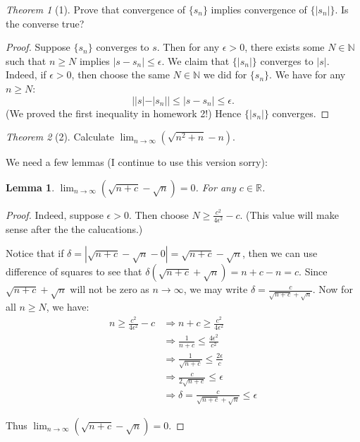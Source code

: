 \documentclass[12pt]{article}
\newtheorem*{lemma}{Lemma}
\theoremstyle{remark}
\theoremstyle{named}
\newtheorem*{theorem}{Theorem}
\renewcommand{\implies}{\Rightarrow}
\begin{document}
\begin{theorem}[1]
    Prove that convergence of \(\{s_n\}\) implies convergence of \(\{|s_n|\}\). Is the converse true?
\end{theorem}

\begin{proof}
    Suppose \(\{s_n\}\) converges to \(s\). Then for any \(\epsilon > 0\), there exists some \(N \in \mathbb N\) such that \(n \ge N\) implies \(|s - s_n| \le \epsilon\). We claim that \(\{|s_n|\}\) converges to \(|s|\). Indeed, if \(\epsilon > 0\), then choose the same \(N \in \mathbb N\) we did for \(\{s_n\}\). We have for any \(n \ge N\): 
    \[||s| - |s_n|| \le |s - s_n| \le \epsilon.\]
    (We proved the first inequality in homework 2!) Hence \(\{|s_n|\}\) converges.
\end{proof}

\begin{theorem}[2]
    Calculate \(\lim_{n \to \infty} (\sqrt{n^2 + n} - n)\).
\end{theorem}

We need a few lemmas (I continue to use this version sorry):

\begin{lemma}
    \(\lim_{n \to \infty} (\sqrt{n + c} - \sqrt{n}) = 0\). For any \(c \in \mathbb R\).
\end{lemma}

\begin{proof}
    Indeed, suppose \(\epsilon > 0\). Then choose \(N \ge \frac{c^2}{4\epsilon^2} - c\). (This value will make sense after the the calucations.) 

    Notice that if \(\delta = |\sqrt{n + c} - \sqrt{n} - 0| = \sqrt{n + c} - \sqrt{n}\), then we can use difference of squares to see that \(\delta (\sqrt{n + c} + \sqrt{n}) = n + c - n = c\). Since \(\sqrt{n + c} + \sqrt{n}\) will not be zero as \(n \to \infty\), we may write \(\delta = \frac{c}{\sqrt{n + c} + \sqrt{n}}\). Now for all \(n \ge N\), we have:
    \begin{align*}
        n \ge \frac{c^2}{4\epsilon^2} - c &\implies n + c \ge \frac{c^2}{4\epsilon^2} \\
        &\implies \frac{1}{n + c} \le \frac{4\epsilon^2}{c^2} \\
        &\implies \frac{1}{\sqrt{n + c}} \le \frac{2\epsilon}{c} \\
        &\implies \frac{c}{2\sqrt{n + c}} \le \epsilon \\
        &\implies \delta = \frac{c}{\sqrt{n + c} + \sqrt{n}} \le \epsilon
    \end{align*}

    Thus \(\lim_{n \to \infty} (\sqrt{n + c} - \sqrt{n}) = 0\).
\end{proof}
\end{document}
